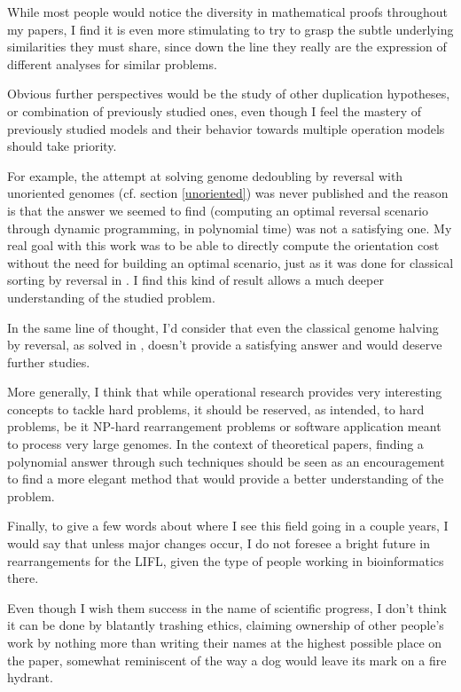 \documentclass[11pt,final,twoside,nofrench]{thlifl}
\begin{document}
While most people would notice the diversity in mathematical proofs throughout my papers, I find it is even more stimulating to try to grasp the subtle underlying similarities they must share, since down the line they really are the expression of different analyses for similar problems.

Obvious further perspectives would be the study of other duplication hypotheses, or combination of previously studied ones, even though I feel the mastery of previously studied models and their behavior towards multiple operation models should take priority.

For example, the attempt at solving genome dedoubling by reversal with unoriented genomes (cf. section \ref{unoriented}) was never published and the reason is that the answer we seemed to find (computing an optimal reversal scenario through dynamic programming, in polynomial time) was not a satisfying one. My real goal with this work was to be able to directly compute the orientation cost without the need for building an optimal scenario, just as it was done for classical sorting by reversal in \cite{BMS-04}. I find this kind of result allows a much deeper understanding of the studied problem.

In the same line of thought, I'd consider that even the classical genome halving by reversal, as solved in \cite{Mabrouk98}, doesn't provide a satisfying answer and would deserve further studies.

More generally, I think that while operational research provides very interesting concepts to tackle hard problems, it should be reserved, as intended, to hard problems, be it NP-hard rearrangement problems or software application meant to process very large genomes. In the context of theoretical papers, finding a polynomial answer through such techniques should be seen as an encouragement to find a more elegant method that would provide a better understanding of the problem.

Finally, to give a few words about where I see this field going in a couple years, I would say that unless major changes occur, I do not foresee a bright future in rearrangements for the LIFL, given the type of people working in bioinformatics there.

Even though I wish them success in the name of scientific progress, I don't think it can be done by blatantly trashing ethics, claiming ownership of other people's work by nothing more than writing their names at the highest possible place on the paper, somewhat reminiscent of the way a dog would leave its mark on a fire hydrant.
\end{document}
